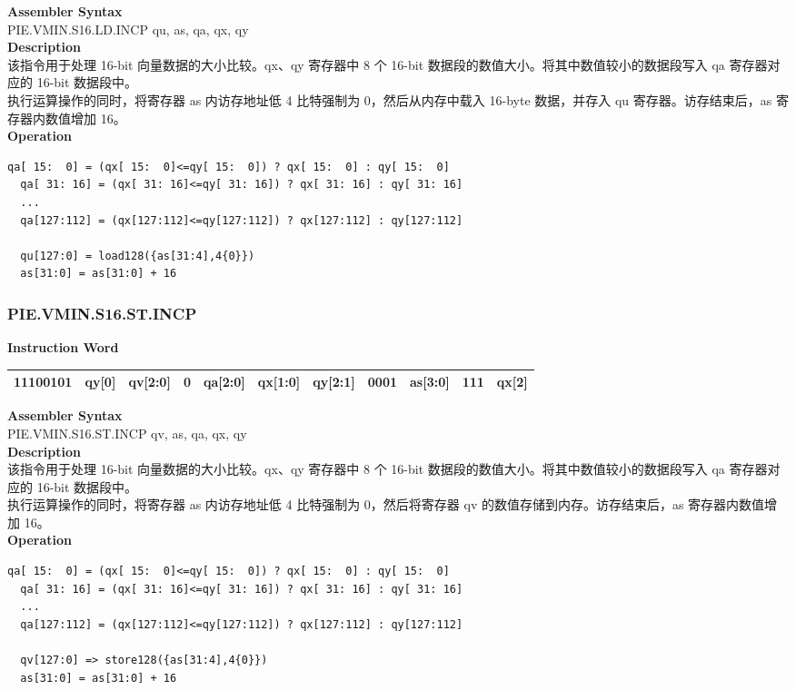 \textbf{Assembler Syntax} \\
PIE.VMIN.S16.LD.INCP qu, as, qa, qx, qy \\
\textbf{Description} \\
该指令用于处理 16-bit 向量数据的大小比较。qx、qy 寄存器中 8 个 16-bit 数据段的数值大小。将其中数值较小的数据段写入 qa 寄存器对应的 16-bit 数据段中。\\
执行运算操作的同时，将寄存器 as 内访存地址低 4 比特强制为 0，然后从内存中载入 16-byte 数据，并存入 qu 寄存器。访存结束后，as 寄存器内数值增加 16。\\
\textbf{Operation}
\begin{lstlisting}[escapeinside=`?]
  qa[ 15:  0] = (qx[ 15:  0]<=qy[ 15:  0]) ? qx[ 15:  0] : qy[ 15:  0]
  qa[ 31: 16] = (qx[ 31: 16]<=qy[ 31: 16]) ? qx[ 31: 16] : qy[ 31: 16]
  ...
  qa[127:112] = (qx[127:112]<=qy[127:112]) ? qx[127:112] : qy[127:112]

  qu[127:0] = load128({as[31:4],4{0}})
  as[31:0] = as[31:0] + 16
\end{lstlisting}

\newpage
\subsubsection{PIE.VMIN.S16.ST.INCP}\label{instruction:PIEVMINS16STINCP}
\setlength\tabcolsep{6pt}
\textbf{Instruction Word} \\
\begin{tabular}{|c|c|c|c|c|c|c|c|c|c|c|}
	\hline
	11100101 & qy[0] & qv[2:0] & 0 & qa[2:0] & qx[1:0] & qy[2:1] & 0001 & as[3:0] & 111 & qx[2] \\
	\hline
\end{tabular}

\textbf{Assembler Syntax} \\
PIE.VMIN.S16.ST.INCP qv, as, qa, qx, qy \\
\textbf{Description} \\
该指令用于处理 16-bit 向量数据的大小比较。qx、qy 寄存器中 8 个 16-bit 数据段的数值大小。将其中数值较小的数据段写入 qa 寄存器对应的 16-bit 数据段中。\\
执行运算操作的同时，将寄存器 as 内访存地址低 4 比特强制为 0，然后将寄存器 qv 的数值存储到内存。访存结束后，as 寄存器内数值增加 16。\\
\textbf{Operation}
\begin{lstlisting}[escapeinside=`?]
  qa[ 15:  0] = (qx[ 15:  0]<=qy[ 15:  0]) ? qx[ 15:  0] : qy[ 15:  0]
  qa[ 31: 16] = (qx[ 31: 16]<=qy[ 31: 16]) ? qx[ 31: 16] : qy[ 31: 16]
  ...
  qa[127:112] = (qx[127:112]<=qy[127:112]) ? qx[127:112] : qy[127:112]

  qv[127:0] => store128({as[31:4],4{0}})
  as[31:0] = as[31:0] + 16
\end{lstlisting}

